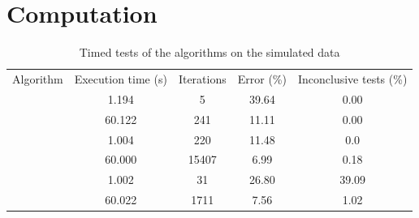 \newpage
\section{Computation}
\label{sec:timed}
\begin{table}[htbp]
\centering
\begin{tabular}{|c|c|c|c|c|}
\hline
Algorithm & Execution time (s) & Iterations & Error (\%) & Inconclusive tests (\%)  \\ \hhline{|=|=|=|=|=|}
\multirow{ 2}{*}{\adaB} & 1.194 & 5 & 39.64 & 0.00  \\\cline{2-5}
& 60.122 & 241 &  11.11 & 0.00  \\ \Xhline{1pt}
\multirow{ 2}{*}{\adaN} & 1.004 & 220 & 11.48  & 0.0 \\\cline{2-5}
& 60.000 & 15407 &  6.99 & 0.18  \\ \Xhline{1pt}
\multirow{ 2}{*}{\squintB} & 1.002 & 31 & 26.80  & 39.09\\\cline{2-5}
 & 60.022 & 1711 &  7.56  &  1.02\\ \hline
\end{tabular}
\caption{Timed tests of the algorithms on the simulated data}
\label{tbl:GDTime}
\end{table}

